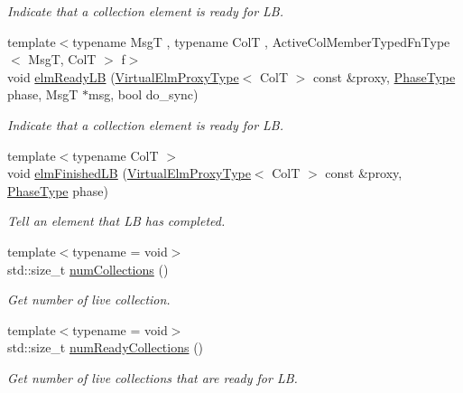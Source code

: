 \begin{DoxyCompactItemize}
\begin{DoxyCompactList}\small\item\em Indicate that a collection element is ready for LB. \end{DoxyCompactList}\item 
{\footnotesize template$<$typename MsgT , typename ColT , Active\+Col\+Member\+Typed\+Fn\+Type$<$ Msg\+T, Col\+T $>$ f$>$ }\\void \hyperlink{structvt_1_1vrt_1_1collection_1_1_collection_manager_ae074993a281f67e9d661481d9aee886e}{elm\+Ready\+LB} (\hyperlink{namespacevt_1_1vrt_a620a5c8c59d13e513f690c74b4af516f}{Virtual\+Elm\+Proxy\+Type}$<$ ColT $>$ const \&proxy, \hyperlink{namespacevt_a46ce6733d5cdbd735d561b7b4029f6d7}{Phase\+Type} phase, MsgT $\ast$msg, bool do\+\_\+sync)
\begin{DoxyCompactList}\small\item\em Indicate that a collection element is ready for LB. \end{DoxyCompactList}\item 
{\footnotesize template$<$typename ColT $>$ }\\void \hyperlink{structvt_1_1vrt_1_1collection_1_1_collection_manager_aa80bf07ee33e5e75de987ac82b79ae18}{elm\+Finished\+LB} (\hyperlink{namespacevt_1_1vrt_a620a5c8c59d13e513f690c74b4af516f}{Virtual\+Elm\+Proxy\+Type}$<$ ColT $>$ const \&proxy, \hyperlink{namespacevt_a46ce6733d5cdbd735d561b7b4029f6d7}{Phase\+Type} phase)
\begin{DoxyCompactList}\small\item\em Tell an element that LB has completed. \end{DoxyCompactList}\item 
{\footnotesize template$<$typename  = void$>$ }\\std\+::size\+\_\+t \hyperlink{structvt_1_1vrt_1_1collection_1_1_collection_manager_a5b443b26d693a78b22234264fecf6832}{num\+Collections} ()
\begin{DoxyCompactList}\small\item\em Get number of live collection. \end{DoxyCompactList}\item 
{\footnotesize template$<$typename  = void$>$ }\\std\+::size\+\_\+t \hyperlink{structvt_1_1vrt_1_1collection_1_1_collection_manager_a3fdd38adcd76281ada50f867e82817c6}{num\+Ready\+Collections} ()
\begin{DoxyCompactList}\small\item\em Get number of live collections that are ready for LB. \end{DoxyCompactList}\item 

\end{DoxyCompactItemize}
